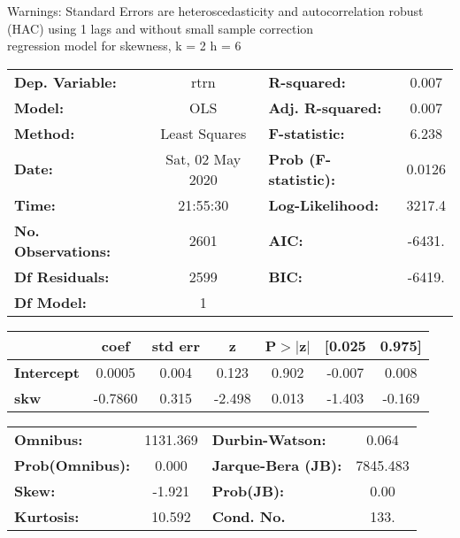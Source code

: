 Warnings: \newline
 [1] Standard Errors are heteroscedasticity and autocorrelation robust (HAC) using 1 lags and without small sample correction\\ 

regression model for skewness, k = 2 h = 6\begin{center}
\begin{tabular}{lclc}
\toprule
\textbf{Dep. Variable:}    &       rtrn       & \textbf{  R-squared:         } &     0.007   \\
\textbf{Model:}            &       OLS        & \textbf{  Adj. R-squared:    } &     0.007   \\
\textbf{Method:}           &  Least Squares   & \textbf{  F-statistic:       } &     6.238   \\
\textbf{Date:}             & Sat, 02 May 2020 & \textbf{  Prob (F-statistic):} &   0.0126    \\
\textbf{Time:}             &     21:55:30     & \textbf{  Log-Likelihood:    } &    3217.4   \\
\textbf{No. Observations:} &        2601      & \textbf{  AIC:               } &    -6431.   \\
\textbf{Df Residuals:}     &        2599      & \textbf{  BIC:               } &    -6419.   \\
\textbf{Df Model:}         &           1      & \textbf{                     } &             \\
\bottomrule
\end{tabular}
\begin{tabular}{lcccccc}
                   & \textbf{coef} & \textbf{std err} & \textbf{z} & \textbf{P$> |$z$|$} & \textbf{[0.025} & \textbf{0.975]}  \\
\midrule
\textbf{Intercept} &       0.0005  &        0.004     &     0.123  &         0.902        &       -0.007    &        0.008     \\
\textbf{skw}       &      -0.7860  &        0.315     &    -2.498  &         0.013        &       -1.403    &       -0.169     \\
\bottomrule
\end{tabular}
\begin{tabular}{lclc}
\textbf{Omnibus:}       & 1131.369 & \textbf{  Durbin-Watson:     } &    0.064  \\
\textbf{Prob(Omnibus):} &   0.000  & \textbf{  Jarque-Bera (JB):  } & 7845.483  \\
\textbf{Skew:}          &  -1.921  & \textbf{  Prob(JB):          } &     0.00  \\
\textbf{Kurtosis:}      &  10.592  & \textbf{  Cond. No.          } &     133.  \\
\bottomrule
\end{tabular}
\end{center}

